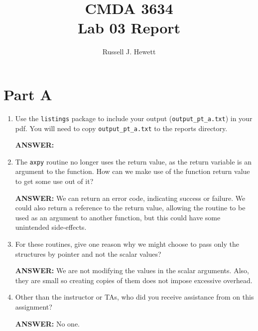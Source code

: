 \documentclass[letter]{article}
\title{CMDA 3634 \\ Lab 03 Report}
\author{Russell J. Hewett}
\begin{document}
\maketitle

\section*{Part A}

\begin{enumerate}
    \item Use the \texttt{listings} package to include your output (\texttt{output\_pt\_a.txt}) in your pdf.  You will need to copy \texttt{output\_pt\_a.txt} to the reports directory.
    
    \textbf{ANSWER:} %
	

    \item The \texttt{axpy} routine no longer uses the return value, as the return variable is an argument to the function.  How can we make use of the function return value to get some use out of it?

    \textbf{ANSWER:} We can return an error code, indicating success or failure.  We could also return a reference to the return value, allowing the routine to be used as an argument to another function, but this could have some unintended side-effects.

    \item For these routines, give one reason why we might choose to pass only the structures by pointer and not the scalar values?
    
    \textbf{ANSWER:} We are not modifying the values in the scalar arguments.  Also, they are small so creating copies of them does not impose excessive overhead.

    \item Other than the instructor or TAs, who did you receive assistance from on this assignment?
    
    \textbf{ANSWER:} No one.
\end{enumerate}


% 



\end{document}
